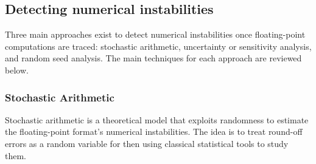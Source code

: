 \documentclass[11pt]{article}
\newcommand{\tristan}[1]{\color{orange}\textbf{From Tristan:} #1\color{black}\xspace}
\begin{document}


\label{sec:detecting-instabilities}
\subsection{Detecting numerical instabilities}

Three main approaches exist to detect numerical instabilities once floating-point computations are traced: stochastic arithmetic, uncertainty or sensitivity analysis, and random seed analysis. The main techniques for each approach are reviewed below. 


\label{sec:mca}
\subsubsection{Stochastic Arithmetic}


Stochastic arithmetic is a theoretical model that exploits randomness to estimate the floating-point format's numerical instabilities. The idea is to treat round-off errors as a random variable for then using classical statistical tools to study them.
\end{document}
